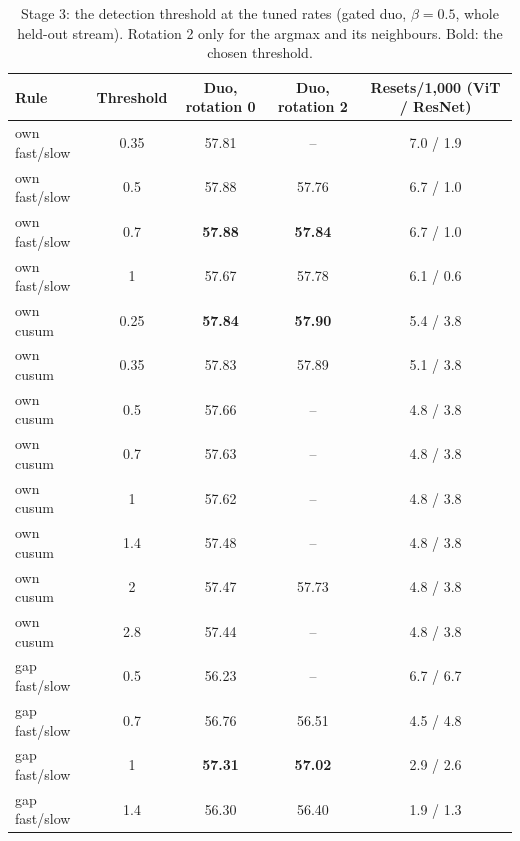 \begin{table}[t]
  \centering\small
  \begin{tabular}{@{}lcccc@{}}
    \toprule
    Rule & Threshold & Duo, rotation 0 & Duo, rotation 2 & Resets/1,000 (ViT / ResNet) \\
    \midrule
    own fast/slow & 0.35 & 57.81 & -- & 7.0 / 1.9 \\
    own fast/slow & 0.5 & 57.88 & 57.76 & 6.7 / 1.0 \\
    own fast/slow & 0.7 & \textbf{57.88} & \textbf{57.84} & 6.7 / 1.0 \\
    own fast/slow & 1 & 57.67 & 57.78 & 6.1 / 0.6 \\
    own cusum & 0.25 & \textbf{57.84} & \textbf{57.90} & 5.4 / 3.8 \\
    own cusum & 0.35 & 57.83 & 57.89 & 5.1 / 3.8 \\
    own cusum & 0.5 & 57.66 & -- & 4.8 / 3.8 \\
    own cusum & 0.7 & 57.63 & -- & 4.8 / 3.8 \\
    own cusum & 1 & 57.62 & -- & 4.8 / 3.8 \\
    own cusum & 1.4 & 57.48 & -- & 4.8 / 3.8 \\
    own cusum & 2 & 57.47 & 57.73 & 4.8 / 3.8 \\
    own cusum & 2.8 & 57.44 & -- & 4.8 / 3.8 \\
    gap fast/slow & 0.5 & 56.23 & -- & 6.7 / 6.7 \\
    gap fast/slow & 0.7 & 56.76 & 56.51 & 4.5 / 4.8 \\
    gap fast/slow & 1 & \textbf{57.31} & \textbf{57.02} & 2.9 / 2.6 \\
    gap fast/slow & 1.4 & 56.30 & 56.40 & 1.9 / 1.3 \\
    \bottomrule
  \end{tabular}
  \caption{Stage 3: the detection threshold at the tuned rates (gated duo, $\beta=0.5$, whole held-out stream). Rotation 2 only for the argmax and its neighbours. Bold: the chosen threshold.}
  \label{tab:tune_thresholds}
\end{table}
